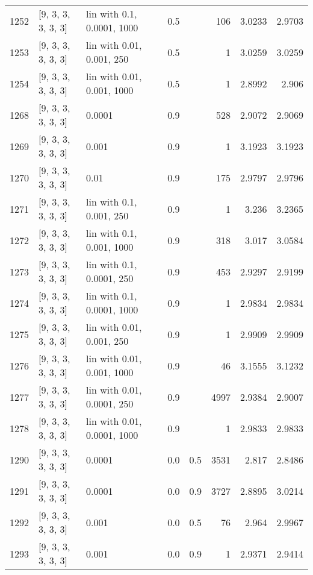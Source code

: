 \begin{longtable}{lllrrrrr}
 1252 & [9, 3, 3, 3, 3, 3] &  lin with 0.1, 0.0001, 1000 &      0.5 &     &  106 &   3.0233 &   2.9703 \\
 1253 & [9, 3, 3, 3, 3, 3] &   lin with 0.01, 0.001, 250 &      0.5 &     &    1 &   3.0259 &   3.0259 \\
 1254 & [9, 3, 3, 3, 3, 3] &  lin with 0.01, 0.001, 1000 &      0.5 &     &    1 &   2.8992 &    2.906 \\
 1268 & [9, 3, 3, 3, 3, 3] &                      0.0001 &      0.9 &     &  528 &   2.9072 &   2.9069 \\
 1269 & [9, 3, 3, 3, 3, 3] &                       0.001 &      0.9 &     &    1 &   3.1923 &   3.1923 \\
 1270 & [9, 3, 3, 3, 3, 3] &                        0.01 &      0.9 &     &  175 &   2.9797 &   2.9796 \\
 1271 & [9, 3, 3, 3, 3, 3] &    lin with 0.1, 0.001, 250 &      0.9 &     &    1 &    3.236 &   3.2365 \\
 1272 & [9, 3, 3, 3, 3, 3] &   lin with 0.1, 0.001, 1000 &      0.9 &     &  318 &    3.017 &   3.0584 \\
 1273 & [9, 3, 3, 3, 3, 3] &   lin with 0.1, 0.0001, 250 &      0.9 &     &  453 &   2.9297 &   2.9199 \\
 1274 & [9, 3, 3, 3, 3, 3] &  lin with 0.1, 0.0001, 1000 &      0.9 &     &    1 &   2.9834 &   2.9834 \\
 1275 & [9, 3, 3, 3, 3, 3] &   lin with 0.01, 0.001, 250 &      0.9 &     &    1 &   2.9909 &   2.9909 \\
 1276 & [9, 3, 3, 3, 3, 3] &  lin with 0.01, 0.001, 1000 &      0.9 &     &   46 &   3.1555 &   3.1232 \\
 1277 & [9, 3, 3, 3, 3, 3] &  lin with 0.01, 0.0001, 250 &      0.9 &     & 4997 &   2.9384 &   2.9007 \\
 1278 & [9, 3, 3, 3, 3, 3] & lin with 0.01, 0.0001, 1000 &      0.9 &     &    1 &   2.9833 &   2.9833 \\
 1290 & [9, 3, 3, 3, 3, 3] &                      0.0001 &      0.0 & 0.5 & 3531 &    2.817 &   2.8486 \\
 1291 & [9, 3, 3, 3, 3, 3] &                      0.0001 &      0.0 & 0.9 & 3727 &   2.8895 &   3.0214 \\
 1292 & [9, 3, 3, 3, 3, 3] &                       0.001 &      0.0 & 0.5 &   76 &    2.964 &   2.9967 \\
 1293 & [9, 3, 3, 3, 3, 3] &                       0.001 &      0.0 & 0.9 &    1 &   2.9371 &   2.9414 \\

\end{longtable}
